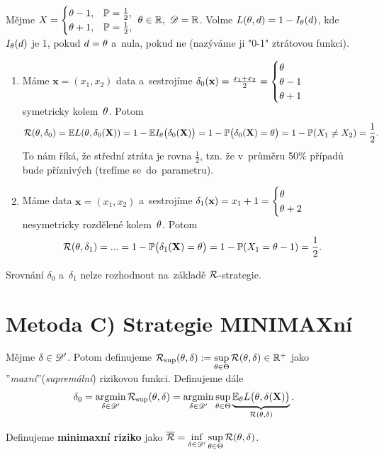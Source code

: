 \begin{example} \label{example:problemy}
	Mějme $X=\begin{cases}
	\theta-1, & \mathbb{P}= \frac{1}{2}, \\ \theta+1, & \mathbb{P}=\frac{1}{2},
	\end{cases}~\theta\in\mathbb{R},~\mathscr{D} =\mathbb{R}$. Volme
	$ L(\theta,d)=1-I_\theta(d)$, kde $I_\theta(d)$ je 1, pokud $d=\theta$ a~nula, pokud ne (nazýváme ji "0-1" ztrátovou funkci).
	
	\begin{enumerate}[1)]
		\item Máme $\textbf{x}=(x_1,x_2)$ data a~sestrojíme $\delta_0(\textbf{x})=\frac{x_1+x_2}{2}=\begin{cases}
		\theta\\\theta-1\\\theta+1
		\end{cases}$ symetricky kolem~$\theta$. Potom
		$$ \mathcal{R}(\theta,\delta_0)=\mathbb{E} L(\theta,\delta_0(\textbf{X}))=1-\mathbb{E} I_\theta\big(\delta_0(\textbf{X})\big)=1-\mathbb{P}\big(\delta_0(\textbf{X})=\theta\big)=1-\mathbb{P}(X_1\neq X_2)=\frac{1}{2}.$$ To nám říká, že střední ztráta je rovna $\frac{1}{2}$, tzn. že v~průměru 50\% případů bude příznivých (trefíme se~do~parametru).
		\item Máme data $\textbf{x}=(x_1,x_2)$ a~sestrojíme $\delta_1(\textbf{x})=x_1+1=\begin{cases}
		\theta\\\theta+2
		\end{cases}$ nesymetricky rozdělené kolem~$\theta$. Potom
		$$\mathcal{R}(\theta,\delta_1)=...=1-\mathbb{P}\big(\delta_1(\textbf{X})=\theta\big)=1-\mathbb{P}(X_1=\theta-1)=\frac{1}{2}.$$
	\end{enumerate}
	Srovnání $\delta_0$ a~$\delta_1$ nelze rozhodnout na~základě $\mathcal{R}$-strategie. 
\end{example}
\section{Metoda C) Strategie MINIMAXní}
\begin{define}
	Mějme $\delta\in\mathscr{D}'$. Potom definujeme $\mathcal{R}_{\sup}(\theta,\delta):=\sup\limits_{\theta\in\Theta} \mathcal{R}(\theta,\delta) \in\mathbb{R}^+$ jako ''\textit{maxní}''(\textit{supremální}) rizikovou funkci. Definujeme dále
	$$ \delta_0=\mathop{\mathrm{argmin}}\limits_{\delta\in\mathscr{D}'}\mathcal{R}_{\sup}(\theta,\delta)=\mathop{\mathrm{argmin}}\limits_{\delta\in\mathscr{D}' }\sup\limits_{\theta\in\Theta}\underbrace{\mathbb{E}_\theta L\big(\theta,\delta(\textbf{X})\big)}_{\mathcal{R}(\theta,\delta)}.$$
\end{define}

\begin{define}
	Definujeme \textbf{minimaxní riziko} jako $\overline{\mathcal{R}}=\inf\limits_{\delta\in\mathscr{D}'}\sup\limits_{\theta\in\Theta}\mathcal{R}(\theta,\delta)$.
\end{define}

